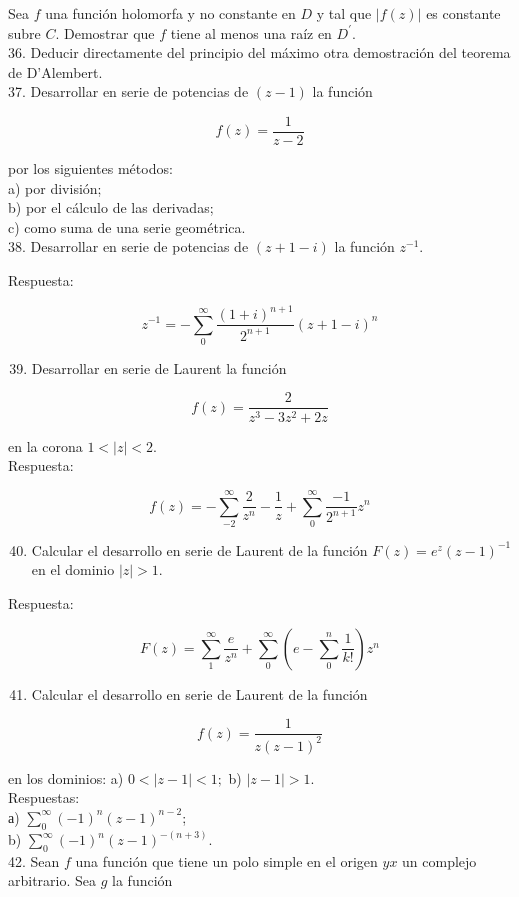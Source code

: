 \documentclass[10pt]{article}
\theoremstyle{plain}
\theoremstyle{definition}
\theoremstyle{remark}
\begin{document}
Sea $f$ una función holomorfa y no constante en $D$ y tal que $|f(z)|$ es constante subre $C$. Demostrar que $f$ tiene al menos una raíz en $D^{\prime}$.\\
36. Deducir directamente del principio del máximo otra demostración del teorema de D'Alembert.\\
37. Desarrollar en serie de potencias de $(z-1)$ la función

$$
f(z)=\frac{1}{z-2}
$$

por los siguientes métodos:\\
a) por división;\\
b) por el cálculo de las derivadas;\\
c) como suma de una serie geométrica.\\
38. Desarrollar en serie de potencias de $(z+1-i)$ la función $z^{-1}$.

Respuesta:

$$
z^{-1}=-\sum_{0}^{\infty} \frac{(1+i)^{n+1}}{2^{n+1}}(z+1-i)^{n}
$$

\begin{enumerate}
  \setcounter{enumi}{38}
  \item Desarrollar en serie de Laurent la función
\end{enumerate}

$$
f(z)=\frac{2}{z^{3}-3 z^{2}+2 z}
$$

en la corona $1<|z|<2$.\\
Respuesta:

$$
f(z)=-\sum_{-2}^{\infty} \frac{2}{z^{n}}-\frac{1}{z}+\sum_{0}^{\infty} \frac{-1}{2^{n+1}} z^{n}
$$

\begin{enumerate}
  \setcounter{enumi}{39}
  \item Calcular el desarrollo en serie de Laurent de la función $F(z)=e^{z}(z-1)^{-1}$ en el dominio $|z|>1$.
\end{enumerate}

Respuesta:

$$
F(z)=\sum_{1}^{\infty} \frac{e}{z^{n}}+\sum_{0}^{\infty}\left(e-\sum_{0}^{n} \frac{1}{k!}\right) z^{n}
$$

\begin{enumerate}
  \setcounter{enumi}{40}
  \item Calcular el desarrollo en serie de Laurent de la función
\end{enumerate}

$$
f(z)=\frac{1}{z(z-1)^{2}}
$$

en los dominios: a) $0<|z-1|<1 ;$ b) $|z-1|>1$.\\
Respuestas:\\
а) $\sum_{0}^{\infty}(-1)^{n}(z-1)^{n-2}$;\\
b) $\sum_{0}^{\infty}(-1)^{n}(z-1)^{-(n+3)}$.\\
42. Sean $f$ una función que tiene un polo simple en el origen $y x$ un complejo arbitrario. Sea $g$ la función
\end{document}
